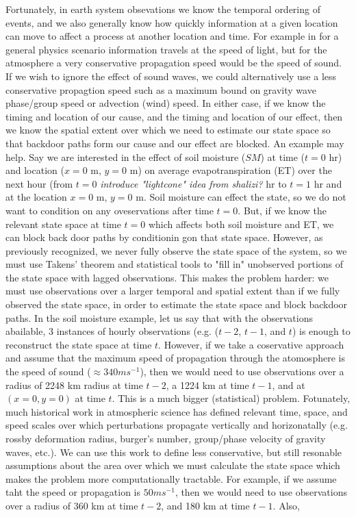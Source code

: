 \documentclass[12pt]{article}
\begin{document}
Fortunately, in earth system obsevations we know the temporal
ordering of events, and we also generally know how quickly
information at a given location can move to affect a process at
another location and time. For example in for a general physics
scenario information travels at the speed of light, but for the
atmosphere a very conservative propagation speed would be the
speed of sound. If we wish to ignore the effect of sound waves, we
could alternatively use a less conservative propagtion speed such
as a maximum bound on gravity wave phase/group speed or advection
(wind) speed. In either case, if we know the timing and location
of our cause, and the timing and location of our effect, then we
know the spatial extent over which we need to estimate our state
space so that backdoor paths form our cause and our effect are
blocked. An example may help. Say we are interested in the effect
of soil moisture (\(SM\)) at time (\(t=0\) hr) and location (\(x=0\) m,
\(y=0\) m) on average evapotranspiration (ET) over the next hour
(from \(t=0\) \emph{introduce "lightcone" idea from shalizi?} hr to \(t=1\)
hr and at the location \(x=0\) m, \(y = 0\) m. Soil moisture can
effect the state, so we do not want to condition on any
oveservations after time \(t=0\). But, if we know the relevant state
space at time \(t=0\) which affects both soil moisture and ET, we
can block back door paths by conditionin gon that state space.
However, as previously recognized, we never fully observe the
state space of the system, so we must use Takens' theorem and
statistical tools to "fill in" unobserved portions of the state
space with lagged observations. This makes the problem harder: we
must use observations over a larger temporal and spatial extent
than if we fully observed the state space, in order to estimate
the state space and block backdoor paths. In the soil moisture
example, let us say that with the observations abailable, 3
instances of hourly observations (e.g. (\(t-2\), \(t-1\), and \(t\)) is
enough to reconstruct the state space at time \(t\).  However, if we
take a coservative approach and assume that the maximum speed of
propagation through the atomosphere is the speed of sound
(\(\approx 340 m s^{-1}\)), then we would need to use observations
over a radius of 2248 km radius at time \(t-2\), a 1224 km at time
\(t-1\), and at \((x=0, y=0)\) at time \(t\). This is a much bigger
(statistical) problem. Fotunately, much historical work in
atmospheric science has defined relevant time, space, and speed
scales over which perturbations propagate vertically and
horizonatally (e.g. rossby deformation radius, burger's number,
group/phase velocity of gravity waves, etc.). We can use this work
to define less conservative, but still resonable assumptions about
the area over which we must calculate the state space which makes
the problem more computationally tractable.  For example, if we
assume taht the speed or propagation is \(50 m s^{-1}\), then we
would need to use observations over a radius of 360 km at time
\(t-2\), and 180 km at time \(t-1\). Also,
\end{document}
